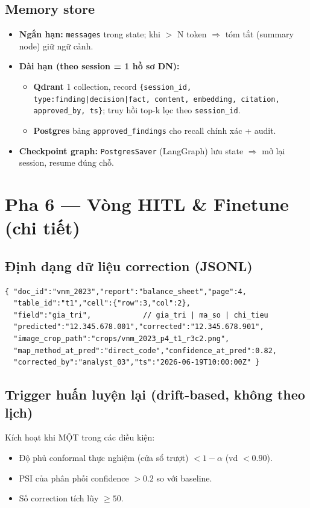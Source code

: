 \documentclass[11pt,a4paper]{article}
\begin{document}
\subsection{Memory store}
\begin{itemize}
  \item \textbf{Ngắn hạn:} \texttt{messages} trong state; khi $>$ N token $\Rightarrow$ tóm tắt (summary node) giữ ngữ cảnh.
  \item \textbf{Dài hạn (theo session = 1 hồ sơ DN):}
  \begin{itemize}
    \item \textbf{Qdrant} 1 collection, record \texttt{\{session\_id, type:finding|decision|fact, content, embedding, citation, approved\_by, ts\}}; truy hồi top-k lọc theo \texttt{session\_id}.
    \item \textbf{Postgres} bảng \texttt{approved\_findings} cho recall chính xác + audit.
  \end{itemize}
  \item \textbf{Checkpoint graph:} \texttt{PostgresSaver} (LangGraph) lưu state $\Rightarrow$ mở lại session, resume đúng chỗ.
\end{itemize}

\section{Pha 6 --- Vòng HITL \& Finetune (chi tiết)}

\subsection{Định dạng dữ liệu correction (JSONL)}
\begin{Verbatim}
{ "doc_id":"vnm_2023","report":"balance_sheet","page":4,
  "table_id":"t1","cell":{"row":3,"col":2},
  "field":"gia_tri",            // gia_tri | ma_so | chi_tieu
  "predicted":"12.345.678.001","corrected":"12.345.678.901",
  "image_crop_path":"crops/vnm_2023_p4_t1_r3c2.png",
  "map_method_at_pred":"direct_code","confidence_at_pred":0.82,
  "corrected_by":"analyst_03","ts":"2026-06-19T10:00:00Z" }
\end{Verbatim}

\subsection{Trigger huấn luyện lại (drift-based, không theo lịch)}
Kích hoạt khi MỘT trong các điều kiện:
\begin{itemize}
  \item Độ phủ conformal thực nghiệm (cửa sổ trượt) $< 1-\alpha$ (vd $<0.90$).
  \item PSI của phân phối confidence $> 0.2$ so với baseline.
  \item Số correction tích lũy $\geq 50$.
\end{itemize}
\end{document}
